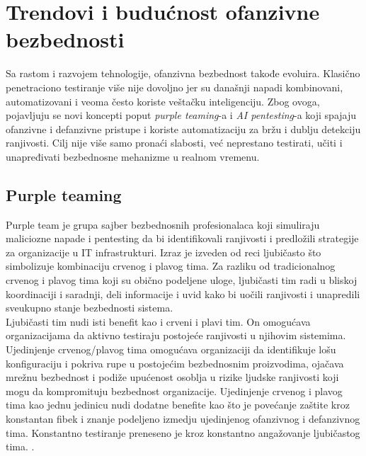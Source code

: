 \documentclass[a4paper,12pt]{article}
\begin{document}
\section{Trendovi i budućnost ofanzivne bezbednosti}
Sa rastom i razvojem tehnologije, ofanzivna bezbednost takođe evoluira. Klasično penetraciono testiranje više nije dovoljno jer su današnji napadi kombinovani, automatizovani i veoma često koriste veštačku inteligenciju. 
\newline
Zbog ovoga, pojavljuju se novi koncepti poput \textit{purple teaming}-a i \textit{AI pentesting}-a koji spajaju ofanzivne i defanzivne pristupe i koriste automatizaciju za bržu i dublju detekciju ranjivosti. Cilj nije više samo pronaći slabosti, već neprestano testirati, učiti i unapređivati bezbednosne mehanizme u realnom vremenu.  
\subsection{Purple teaming}
Purple team je grupa sajber bezbednosnih profesionalaca koji simuliraju maliciozne napade i pentesting da bi identifikovali ranjivosti i predložili strategije za organizacije u IT infrastrukturi. Izraz je izveden od reci ljubičasto što simbolizuje kombinaciju crvenog i plavog tima. Za razliku od tradicionalnog crvenog i plavog tima koji su obično podeljene uloge, ljubičasti tim radi u bliskoj koordinaciji i saradnji, deli informacije i uvid kako bi uočili ranjivosti i unapredili sveukupno stanje bezbednosti sistema.\\
Ljubičasti tim nudi isti benefit kao i crveni i plavi tim. On omogućava organizacijama da aktivno testiraju postojeće ranjivosti u njihovim sistemima. Ujedinjenje crvenog/plavog tima omogućava organizaciji da identifikuje lošu konfiguraciju i pokriva rupe u postojećim bezbednosnim proizvodima, ojačava mrežnu bezbednost i podiže upućenost osoblja u rizike ljudske ranjivosti koji mogu da kompromituju bezbednost organizacije. 
Ujedinjenje crvenog i plavog tima kao jednu jedinicu nudi dodatne benefite kao što je povećanje zaštite kroz konstantan fibek i znanje podeljeno izmedju ujedinjenog ofanzivnog i defanzivnog tima. Konstantno testiranje preneseno je kroz konstantno angažovanje ljubičastog tima. \cite{purple-teaming}.
\end{document}
